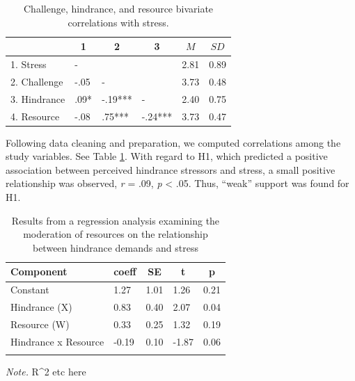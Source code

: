 \documentclass[
  english,
  man]{apa6}
\begin{document}
\begin{table}[tbp]

\begin{center}
\begin{threeparttable}

\caption{\label{tab:cortab}Challenge, hindrance, and resource bivariate correlations with stress.}

\begin{tabular}{llllll}
\toprule
 & \multicolumn{1}{c}{1} & \multicolumn{1}{c}{2} & \multicolumn{1}{c}{3} & \multicolumn{1}{c}{$M$} & \multicolumn{1}{c}{$SD$}\\
\midrule
1. Stress & - &  &  & 2.81 & 0.89\\
2. Challenge & -.05 & - &  & 3.73 & 0.48\\
3. Hindrance & .09* & -.19*** & - & 2.40 & 0.75\\
4. Resource & -.08 & .75*** & -.24*** & 3.73 & 0.47\\
\bottomrule
\end{tabular}

\end{threeparttable}
\end{center}

\end{table}

Following data cleaning and preparation, we computed correlations among the study variables. See Table \ref{tab:cortab}. With regard to H1, which predicted a positive association between perceived hindrance stressors and stress, a small positive relationship was observed, \emph{r} = .09, \emph{p} \textless{} .05. Thus, ``weak'' support was found for H1.

\begin{table}[tbp]

\begin{center}
\begin{threeparttable}

\caption{\label{tab:table}Results from a regression analysis examining the moderation of resources on the relationship between hindrance demands and stress}

\begin{tabular}{lllll}
\toprule
Component & \multicolumn{1}{c}{coeff} & \multicolumn{1}{c}{SE} & \multicolumn{1}{c}{t} & \multicolumn{1}{c}{p}\\
\midrule
Constant & 1.27 & 1.01 & 1.26 & 0.21\\
Hindrance (X) & 0.83 & 0.40 & 2.07 & 0.04\\
Resource (W) & 0.33 & 0.25 & 1.32 & 0.19\\
Hindrance x Resource & -0.19 & 0.10 & -1.87 & 0.06\\
\bottomrule
\addlinespace
\end{tabular}

\begin{tablenotes}[para]
\normalsize{\textit{Note.} R\textasciicircum{}2 etc here}
\end{tablenotes}

\end{threeparttable}
\end{center}

\end{table}
\end{document}
